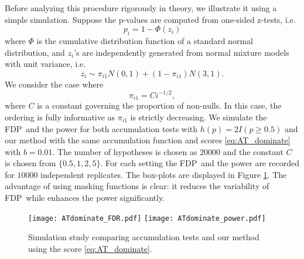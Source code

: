 \documentclass{biometrika}
\newcommand{\textFDP}{FDP}
\newcommand{\1}{\mathbf{1}}
\begin{document}
Before analyzing this procedure rigorously in theory, we illustrate it using a simple simulation. Suppose the p-values are computed from one-sided z-tests, i.e.
\[p_{i} = 1 - \Phi(z_{i})\]
where $\Phi$ is the cumulative distribution function of a standard normal distribution, and $z_{i}$'s are independently generated from normal mixture models with unit variance, i.e.
\[z_{i}\sim \pi_{i1}N(0, 1) + (1 - \pi_{i1})N(3, 1).\]
We consider the case where 
\[\pi_{i1} = Ci^{-1/2},\]
where $C$ is a constant governing the proportion of non-nulls. In this case, the ordering is fully informative as $\pi_{i1}$ is strictly decreasing. We simulate the \textFDP ~and the power for both accumulation tests with $h(p) = 2I(p\ge 0.5)$ and our method with the same accumulation function and scores \eqref{eq:AT_dominate} with $b = 0.01$. The number of hypotheses is chosen as $20000$ and the constant $C$ is chosen from $\{0.5, 1, 2, 5\}$. For each setting the \textFDP ~and the power are recorded for $10000$ independent replicates. The box-plots are displayed in Figure \ref{fig:AT_dominate}. The advantage of using masking functions is clear: it reduces the variability of \textFDP ~while enhances the power significantly.

\begin{figure}[htp]
  \centering
  \texttt{[image: ATdominate\_FDR.pdf]}
  \texttt{[image: ATdominate\_power.pdf]}
  \caption{Simulation study comparing accumulation tests and our method using the score \eqref{eq:AT_dominate}.}\label{fig:AT_dominate}
\end{figure}
\end{document}
